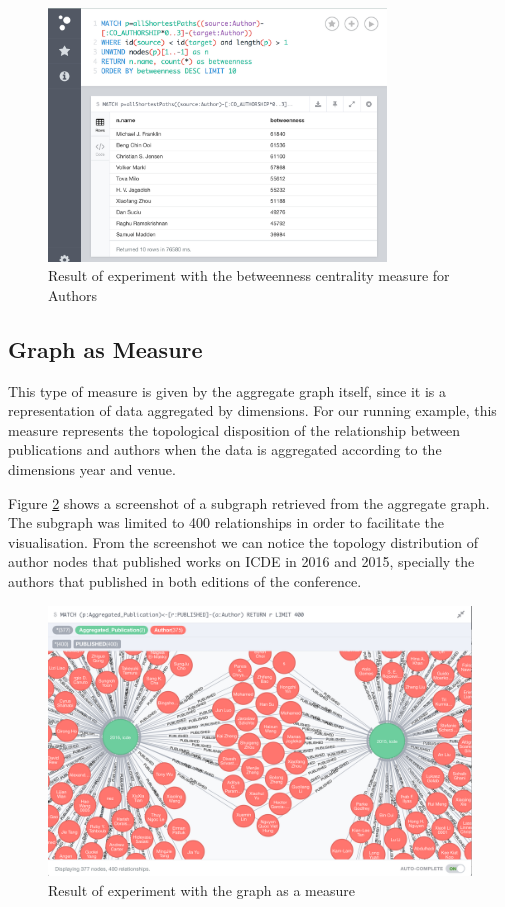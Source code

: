 \begin{figure}[!h]
\centering
\includegraphics[width=0.8\textwidth]{../exp_betweenness_centrality.png}
\caption{Result of experiment with the betweenness centrality measure for Authors}
\label{fig:figure36}
\end{figure}

\subsection{Graph as Measure}
This type of measure is given by the aggregate graph itself, since it is a representation of data aggregated by dimensions. For our running example, this measure represents the topological disposition of the relationship between publications and authors when the data is aggregated according to the dimensions year and venue.  

Figure \ref{fig:figure37} shows a screenshot of a subgraph retrieved from the aggregate graph. The subgraph was limited to 400 relationships in order to facilitate the visualisation. From the screenshot we can notice the topology distribution of author nodes that published works on ICDE in 2016 and 2015, specially the authors that published in both editions of the conference.

\begin{figure}[!h]
\centering
\includegraphics[width=1\textwidth]{../graph_measure.png}
\caption{Result of experiment with the graph as a measure}
\label{fig:figure37}
\end{figure}

